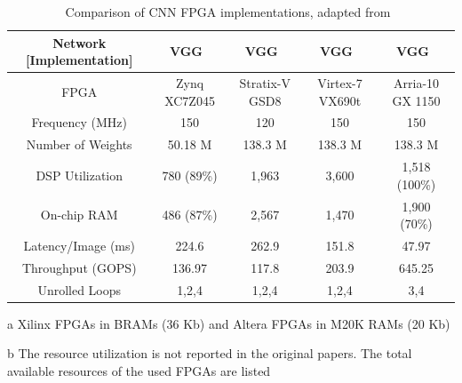 \begin{table}[!htb]
	\renewcommand{\arraystretch}{1.2} %
	\centering
	\caption[Table caption shown in TOC.]{Comparison of CNN FPGA implementations, adapted from~\cite{Ma:80_OptDataflow_in_CNN}}
	\label{tab:Ma_comparison}
	\begin{threeparttable}
	\begin{tabular}{|c|c|c|c|c|}
		\hline
		Network [Implementation]     & VGG~\cite{Ma_comp_ref10}	& VGG~\cite{Ma_comp_ref9} & VGG~\cite{Ma_comp_ref8} & VGG~\cite{Ma:80_OptDataflow_in_CNN}  \\ \hline
		FPGA      			 & Zynq XC7Z045 & Stratix-V GSD8 & Virtex-7 VX690t & Arria-10 GX 1150    \\  \hline
		Frequency (MHz)		& 150			& 120			&150				&	150			\\  \hline
		Number of Weights	& 50.18 M		&	138.3 M		&138.3 M			&138.3 M				\\  \hline
		DSP Utilization 	& 780 (89\%)	& 1,963\tnote{b}		&	3,600\tnote{b}			&1,518 (100\%)				\\  \hline
		On-chip RAM\tnote{a}			& 486 (87\%)	& 2,567\tnote{b}		&1,470\tnote{b}				&1,900 (70\%)				\\  \hline 
		Latency/Image (ms) & 224.6			&262.9			&151.8				&47.97				\\  \hline
		Throughput (GOPS)	&136.97			&117.8			&203.9				&645.25				\\ \hline
		Unrolled Loops		& 1,2,4		& 1,2,4				& 1,2,4					& 3,4				\\ \hline
	\end{tabular}
		\begin{tablenotes}
	\item[a] Xilinx FPGAs in BRAMs (36 Kb) and Altera FPGAs in M20K RAMs (20 Kb)\\
	\item[b] The resource utilization is not reported in the original papers. The total available resources of the used FPGAs are listed
\end{tablenotes}
\end{threeparttable}
\end{table}


